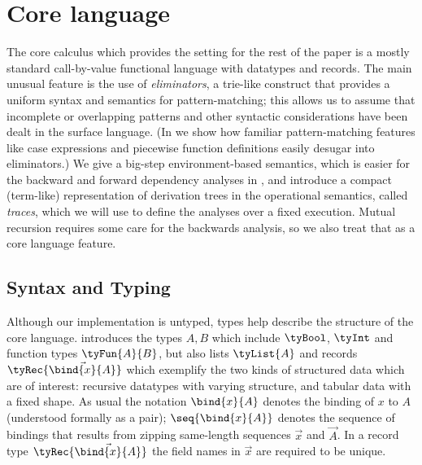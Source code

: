 \section{Core language}
\label{sec:core-language}

The core calculus which provides the setting for the rest of the paper is a mostly standard call-by-value functional language with datatypes and records. The main unusual feature is the use of \emph{eliminators}, a trie-like construct that provides a uniform syntax and semantics for pattern-matching; this allows us to assume that incomplete or overlapping patterns and other syntactic considerations have been dealt in the surface language. (In  we show how familiar pattern-matching features like case expressions and piecewise function definitions easily desugar into eliminators.) We give a big-step environment-based semantics, which is easier for the backward and forward dependency analyses in , and introduce a compact (term-like) representation of derivation trees in the operational semantics, called \emph{traces}, which we will use to define the analyses over a fixed execution. Mutual recursion requires some care for the backwards analysis, so we also treat that as a core language feature.

\subsection{Syntax and Typing}
\label{sec:core-language:syntax-typing}

Although our implementation is untyped, types help describe the structure of the core language.  introduces the types $A, B$ which include $\tyBool$, $\tyInt$ and function types $\tyFun{A}{B}$, but also lists $\tyList{A}$ and records $\tyRec{\vec{\bind{x}{A}}}$ which exemplify the two kinds of structured data which are of interest: recursive datatypes with varying structure, and tabular data with a fixed shape. As usual the notation $\bind{x}{A}$ denotes the binding of $x$ to $A$ (understood formally as a pair); $\seq{\bind{x}{A}}$ denotes the sequence of bindings that results from zipping same-length sequences $\vec{x}$ and $\vec{A}$. In a record type $\tyRec{\vec{\bind{x}{A}}}$ the field names in $\vec{x}$ are required to be unique.



